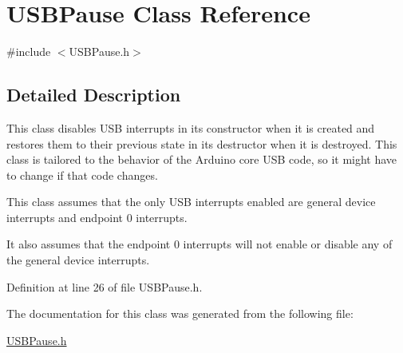 \hypertarget{class_u_s_b_pause}{}\section{U\+S\+B\+Pause Class Reference}
\label{class_u_s_b_pause}


{\ttfamily \#include $<$U\+S\+B\+Pause.\+h$>$}



\subsection{Detailed Description}
This class disables U\+SB interrupts in its constructor when it is created and restores them to their previous state in its destructor when it is destroyed. This class is tailored to the behavior of the Arduino core U\+SB code, so it might have to change if that code changes.

This class assumes that the only U\+SB interrupts enabled are general device interrupts and endpoint 0 interrupts.

It also assumes that the endpoint 0 interrupts will not enable or disable any of the general device interrupts. 

Definition at line 26 of file U\+S\+B\+Pause.\+h.



The documentation for this class was generated from the following file\+:\begin{DoxyCompactItemize}
\item 
\hyperlink{_u_s_b_pause_8h}{U\+S\+B\+Pause.\+h}\end{DoxyCompactItemize}
